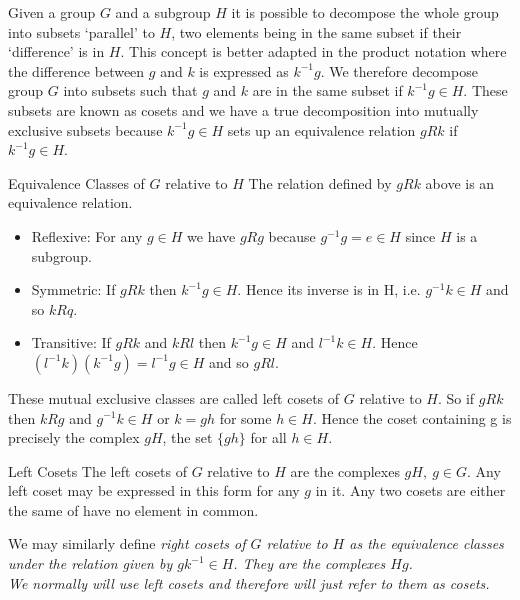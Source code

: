 Given a group $G$ and a subgroup $H$ it is possible to decompose the whole group into subsets `parallel' to $H$, two elements being in the same subset if their `difference' is in $H$. This concept is 
better adapted in the product notation where the difference between $g$ and $k$ is expressed as $k^{-1}g$. We therefore decompose group $G$ into subsets such that $g$ and $k$ are 
in the same subset if $k^{-1}g\in H$. These subsets are known as cosets and we have a true decomposition into mutually exclusive subsets because $k^{-1}g\in H$ sets up an equivalence
relation $gRk$ if $k^{-1}g\in H$.

\begin{theorem}{Equivalence Classes of $G$ relative to $H$}
The relation defined by $gRk$ above is an equivalence relation.
\end{theorem}

\begin{itemize}
\item[(1)] Reflexive: For any $g\in H$ we have $gRg$ because $g^{-1}g = e \in H$ since $H$ is a subgroup.
\item[(2)] Symmetric: If $gRk$ then $k^{-1}g \in H$. Hence its inverse is in H, i.e. $g^{-1}k\in H$ and so $kRq$.
\item[(3)] Transitive: If $gRk$ and $kRl$ then $k^{-1}g \in H$ and $l^{-1}k \in H$. Hence $(l^{-1}k)(k^{-1}g) = l^{-1}g \in H$ and so $gRl$.
\end{itemize}

These mutual exclusive classes are called left cosets of $G$ relative to $H$. So if $gRk$ then $kRg$ and $g^{-1}k \in H$ or $k = gh$ for some $h\in H$. Hence the coset containing g is
precisely the complex $gH$, the set $\{gh\}$ for all $h\in H$.

\begin{theorem}{Left Cosets}
The left cosets of $G$ relative to $H$ are the complexes $gH,~g\in G$. Any left coset may be expressed in this form for any $g$ in it. Any two cosets are either the same of have
no element in common.
\end{theorem}

We may similarly define \it  right cosets \rm of $G$ relative to $H$ as the equivalence classes under the relation given by $gk^{-1}\in H$. They are the complexes $Hg$.\\

We normally will use left cosets and therefore will just refer to them as cosets. 